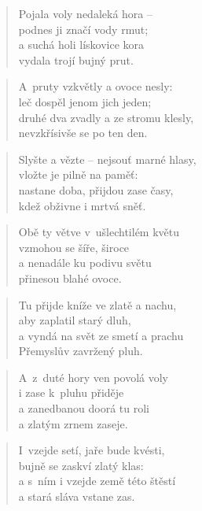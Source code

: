 \begin{verse}
Pojala voly nedaleká hora -- \\
podnes ji značí vody rmut; \\
a suchá holi lískovice kora \\
vydala trojí bujný prut.
\end{verse}

\begin{verse}
A~pruty vzkvětly a ovoce nesly: \\
leč dospěl jenom jich jeden; \\
druhé dva zvadly a ze stromu klesly, \\
nevzkřísivše se po ten den.
\end{verse}

\begin{verse}
Slyšte a vězte -- nejsouť marné hlasy, \\
vložte je pilně na paměť: \\
nastane doba, přijdou zase časy, \\
kdež obživne i mrtvá sněť.
\end{verse}

\begin{verse}
Obě ty větve v~ušlechtilém květu \\
vzmohou se šíře, široce \\
a nenadále ku podivu světu \\
přinesou blahé ovoce.
\end{verse}

\begin{verse}
Tu přijde kníže ve zlatě a nachu, \\
aby zaplatil starý dluh, \\
a vyndá na svět ze smetí a prachu \\
Přemyslův zavržený pluh.
\end{verse}

\begin{verse}
A~z~duté hory ven povolá voly \\
i zase k~pluhu přiděje \\
a zanedbanou doorá tu roli \\
a zlatým zrnem zaseje.
\end{verse}

\begin{verse}
I~vzejde setí, jaře bude kvésti, \\
bujně se zaskví zlatý klas: \\
a s~ním i vzejde země této štěstí \\
a stará sláva vstane zas.
\end{verse}

